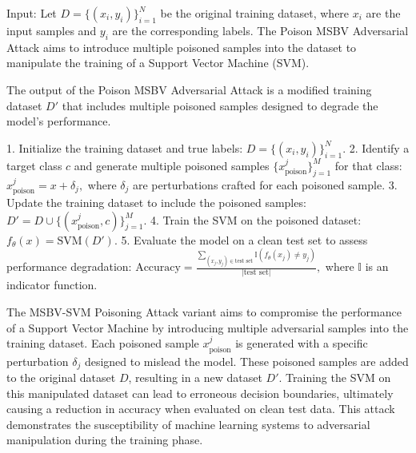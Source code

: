 Input: Let $D = \{(x_i, y_i)\}_{i=1}^N$ be the original training dataset, where $x_i$ are the input samples and $y_i$ are the corresponding labels. The Poison MSBV Adversarial Attack aims to introduce multiple poisoned samples into the dataset to manipulate the training of a Support Vector Machine (SVM).

The output of the Poison MSBV Adversarial Attack is a modified training dataset $D'$ that includes multiple poisoned samples designed to degrade the model's performance.

1. Initialize the training dataset and true labels:
   $
   D = \{(x_i, y_i)\}_{i=1}^N.
   $
2. Identify a target class $c$ and generate multiple poisoned samples $\{x_{\text{poison}}^j\}_{j=1}^M$ for that class:
   $
   x_{\text{poison}}^j = x + \delta_j,
   $
   where $\delta_j$ are perturbations crafted for each poisoned sample.
3. Update the training dataset to include the poisoned samples:
   $
   D' = D \cup \{(x_{\text{poison}}^j, c)\}_{j=1}^M.
   $
4. Train the SVM on the poisoned dataset:
   $
   f_{\theta}(x) = \text{SVM}(D').
   $
5. Evaluate the model on a clean test set to assess performance degradation:
   $
   \text{Accuracy} = \frac{\sum_{(x_j, y_j) \in \text{test set}} \mathbb{I}(f_{\theta}(x_j) \neq y_j)}{|\text{test set}|},
   $
   where $\mathbb{I}$ is an indicator function.

The MSBV-SVM Poisoning Attack variant aims to compromise the performance of a Support Vector Machine by introducing multiple adversarial samples into the training dataset. Each poisoned sample $x_{\text{poison}}^j$ is generated with a specific perturbation $\delta_j$ designed to mislead the model. These poisoned samples are added to the original dataset $D$, resulting in a new dataset $D'$. Training the SVM on this manipulated dataset can lead to erroneous decision boundaries, ultimately causing a reduction in accuracy when evaluated on clean test data. This attack demonstrates the susceptibility of machine learning systems to adversarial manipulation during the training phase.